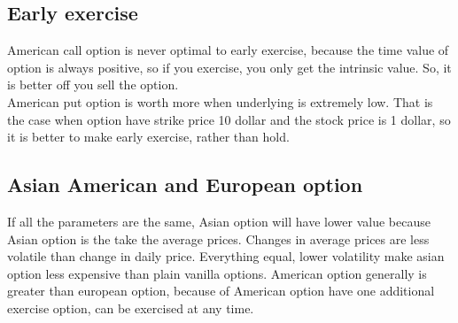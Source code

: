 \documentclass[a4paper,11pt]{article}
\begin{document}
\subsection{Early exercise}
American call option is never optimal to early exercise, because the time value of option is always positive, so if you exercise, you only get the intrinsic value. So, it is better off you sell the option.\\
American put option is worth more when underlying is extremely low. That is the case when option have strike price 10 dollar and the stock price is 1 dollar, so it is better to make early exercise, rather than hold.
\subsection{Asian American and European option}
If all the parameters are the same, Asian option will have lower value because Asian option is the take the average prices. Changes in average prices are less volatile than change in daily price. Everything equal, lower volatility make asian option less expensive than plain vanilla options. American option generally is greater than european option, because of American option have one additional exercise option, can be exercised at any time.
\end{document}
